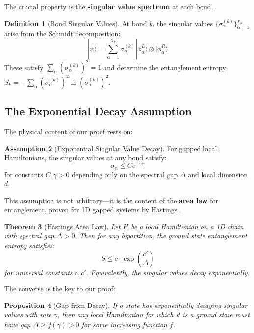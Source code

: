 \documentclass[12pt,a4paper]{article}
\theoremstyle{plain}
\newtheorem{theorem}{Theorem}[section]
\newtheorem{proposition}[theorem]{Proposition}
\theoremstyle{definition}
\newtheorem{definition}[theorem]{Definition}
\newtheorem{assumption}[theorem]{Assumption}
\theoremstyle{remark}
\newcommand{\ket}[1]{|#1\rangle}
\begin{document}
The crucial property is the \textbf{singular value spectrum} at each bond.

\begin{definition}[Bond Singular Values]
At bond $k$, the singular values $\{\sigma^{(k)}_\alpha\}_{\alpha=1}^{\chi_k}$ arise from the Schmidt decomposition:
\begin{equation}
    \ket{\psi} = \sum_{\alpha=1}^{\chi_k} \sigma^{(k)}_\alpha \ket{\phi^L_\alpha} \otimes \ket{\phi^R_\alpha}
\end{equation}
These satisfy $\sum_\alpha (\sigma^{(k)}_\alpha)^2 = 1$ and determine the entanglement entropy $S_k = -\sum_\alpha (\sigma^{(k)}_\alpha)^2 \ln(\sigma^{(k)}_\alpha)^2$.
\end{definition}

\subsection{The Exponential Decay Assumption}

The physical content of our proof rests on:

\begin{assumption}[Exponential Singular Value Decay]
\label{ass:exp-decay}
For gapped local Hamiltonians, the singular values at any bond satisfy:
\begin{equation}
    \sigma_\alpha \leq C e^{-\gamma \alpha}
\end{equation}
for constants $C, \gamma > 0$ depending only on the spectral gap $\Delta$ and local dimension $d$.
\end{assumption}

This assumption is not arbitrary—it is the content of the \textbf{area law} for entanglement, proven for 1D gapped systems by Hastings \cite{hastings2007area}.

\begin{theorem}[Hastings Area Law]
\label{thm:hastings}
Let $H$ be a local Hamiltonian on a 1D chain with spectral gap $\Delta > 0$. Then for any bipartition, the ground state entanglement entropy satisfies:
\begin{equation}
    S \leq c \cdot \exp\left(\frac{c'}{\Delta}\right)
\end{equation}
for universal constants $c, c'$. Equivalently, the singular values decay exponentially.
\end{theorem}

The converse is the key to our proof:

\begin{proposition}[Gap from Decay]
\label{prop:gap-from-decay}
If a state has exponentially decaying singular values with rate $\gamma$, then any local Hamiltonian for which it is a ground state must have gap $\Delta \geq f(\gamma) > 0$ for some increasing function $f$.
\end{proposition}
\end{document}

